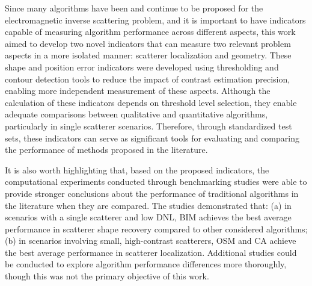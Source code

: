 \documentclass{IEEEtran}
\begin{document}
        Since many algorithms have been and continue to be proposed for the electromagnetic inverse scattering problem, and it is important to have indicators capable of measuring algorithm performance across different aspects, this work aimed to develop two novel indicators that can measure two relevant problem aspects in a more isolated manner: scatterer localization and geometry. These shape and position error indicators were developed using thresholding and contour detection tools to reduce the impact of contrast estimation precision, enabling more independent measurement of these aspects. Although the calculation of these indicators depends on threshold level selection, they enable adequate comparisons between qualitative and quantitative algorithms, particularly in single scatterer scenarios. Therefore, through standardized test sets, these indicators can serve as significant tools for evaluating and comparing the performance of methods proposed in the literature.


        It is also worth highlighting that, based on the proposed indicators, the computational experiments conducted through benchmarking studies were able to provide stronger conclusions about the performance of traditional algorithms in the literature when they are compared. The studies demonstrated that: (a) in scenarios with a single scatterer and low DNL, BIM achieves the best average performance in scatterer shape recovery compared to other considered algorithms; (b) in scenarios involving small, high-contrast scatterers, OSM and CA achieve the best average performance in scatterer localization. Additional studies could be conducted to explore algorithm performance differences more thoroughly, though this was not the primary objective of this work.
        
\end{document}
